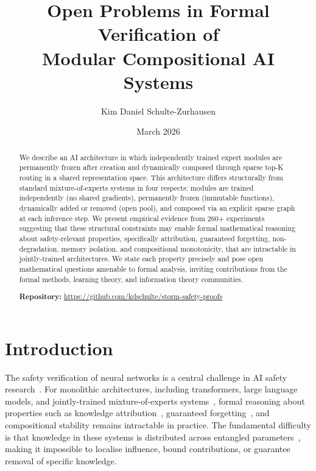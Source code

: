 \documentclass[11pt,a4paper]{article}
\title{Open Problems in Formal Verification of\\Modular Compositional AI Systems}
\author[1]{Kim Daniel Schulte-Zurhausen}
\affil[1]{Modulith Research CIC, London, UK\\
\texttt{research@modulith.ai}}
\date{March 2026}
\begin{document}
\maketitle

\begin{abstract}
We describe an AI architecture in which independently trained expert modules are permanently frozen after creation and dynamically composed through sparse top-K routing in a shared representation space.
This architecture differs structurally from standard mixture-of-experts systems in four respects: modules are trained independently (no shared gradients), permanently frozen (immutable functions), dynamically added or removed (open pool), and composed via an explicit sparse graph at each inference step.
We present empirical evidence from 260+ experiments suggesting that these structural constraints may enable formal mathematical reasoning about safety-relevant properties, specifically attribution, guaranteed forgetting, non-degradation, memory isolation, and compositional monotonicity, that are intractable in jointly-trained architectures.
We state each property precisely and pose open mathematical questions amenable to formal analysis, inviting contributions from the formal methods, learning theory, and information theory communities.

\medskip
\noindent\textbf{Repository:} \url{https://github.com/kdschulte/storm-safety-proofs}
\end{abstract}

\section{Introduction}
\label{sec:intro}

The safety verification of neural networks is a central challenge in AI safety research~\cite{amodei2016concrete}.
For monolithic architectures, including transformers, large language models, and jointly-trained mixture-of-experts systems~\cite{shazeer2017outrageously,fedus2022switch}, formal reasoning about properties such as knowledge attribution~\cite{sundararajan2017axiomatic}, guaranteed forgetting~\cite{bourtoule2021machine}, and compositional stability remains intractable in practice.
The fundamental difficulty is that knowledge in these systems is distributed across entangled parameters~\cite{bricken2023monosemanticity}, making it impossible to localise influence, bound contributions, or guarantee removal of specific knowledge.
\end{document}
